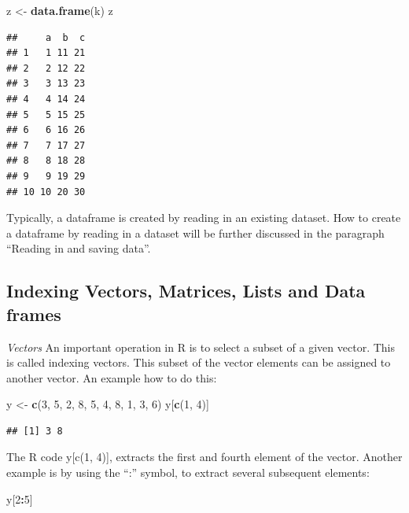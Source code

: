 \documentclass[]{book}
\newenvironment{Shaded}{\begin{snugshade}}{\end{snugshade}}
\newcommand{\KeywordTok}[1]{\textcolor[rgb]{0.13,0.29,0.53}{\textbf{#1}}}
\newcommand{\DecValTok}[1]{\textcolor[rgb]{0.00,0.00,0.81}{#1}}
\newcommand{\StringTok}[1]{\textcolor[rgb]{0.31,0.60,0.02}{#1}}
\newcommand{\OperatorTok}[1]{\textcolor[rgb]{0.81,0.36,0.00}{\textbf{#1}}}
\newcommand{\NormalTok}[1]{#1}
\theoremstyle{definition}
\theoremstyle{definition}
\theoremstyle{definition}
\theoremstyle{remark}
\begin{document}
\begin{Shaded}
\begin{Highlighting}[]
\NormalTok{z <-}\StringTok{ }\KeywordTok{data.frame}\NormalTok{(k)}
\NormalTok{z}
\end{Highlighting}
\end{Shaded}

\begin{verbatim}
##     a  b  c
## 1   1 11 21
## 2   2 12 22
## 3   3 13 23
## 4   4 14 24
## 5   5 15 25
## 6   6 16 26
## 7   7 17 27
## 8   8 18 28
## 9   9 19 29
## 10 10 20 30
\end{verbatim}

Typically, a dataframe is created by reading in an existing dataset. How
to create a dataframe by reading in a dataset will be further discussed
in the paragraph ``Reading in and saving data''.

\subsection{Indexing Vectors, Matrices, Lists and Data
frames}\label{indexing-vectors-matrices-lists-and-data-frames}

\emph{Vectors} An important operation in R is to select a subset of a
given vector. This is called indexing vectors. This subset of the vector
elements can be assigned to another vector. An example how to do this:

\begin{Shaded}
\begin{Highlighting}[]
\NormalTok{y <-}\StringTok{ }\KeywordTok{c}\NormalTok{(}\DecValTok{3}\NormalTok{, }\DecValTok{5}\NormalTok{, }\DecValTok{2}\NormalTok{, }\DecValTok{8}\NormalTok{, }\DecValTok{5}\NormalTok{, }\DecValTok{4}\NormalTok{, }\DecValTok{8}\NormalTok{, }\DecValTok{1}\NormalTok{, }\DecValTok{3}\NormalTok{, }\DecValTok{6}\NormalTok{)}
\NormalTok{y[}\KeywordTok{c}\NormalTok{(}\DecValTok{1}\NormalTok{, }\DecValTok{4}\NormalTok{)]}
\end{Highlighting}
\end{Shaded}

\begin{verbatim}
## [1] 3 8
\end{verbatim}

The R code y{[}c(1, 4){]}, extracts the first and fourth element of the
vector. Another example is by using the ``:'' symbol, to extract several
subsequent elements:

\begin{Shaded}
\begin{Highlighting}[]
\NormalTok{y[}\DecValTok{2}\OperatorTok{:}\DecValTok{5}\NormalTok{]}
\end{Highlighting}
\end{Shaded}
\end{document}
